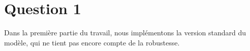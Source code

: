 \section*{Question 1}
 
 Dans la première partie du travail, nous implémentons la version standard du modèle, qui ne tient pas encore compte de la robustesse.














